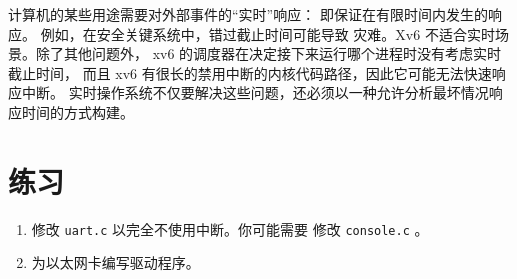 计算机的某些用途需要对外部事件的``实时''响应：
即保证在有限时间内发生的响应。
例如，在安全关键系统中，错过截止时间可能导致
灾难。Xv6 不适合实时场景。除了其他问题外，
xv6 的调度器在决定接下来运行哪个进程时没有考虑实时截止时间，
而且 xv6 有很长的禁用中断的内核代码路径，因此它可能无法快速响应中断。
实时操作系统不仅要解决这些问题，还必须以一种允许分析最坏情况响应时间的方式构建。

\section{练习}

\begin{enumerate}

\item 修改 {\tt uart.c} 以完全不使用中断。你可能需要
修改 {\tt console.c} 。

\item 为以太网卡编写驱动程序。

\end{enumerate}
